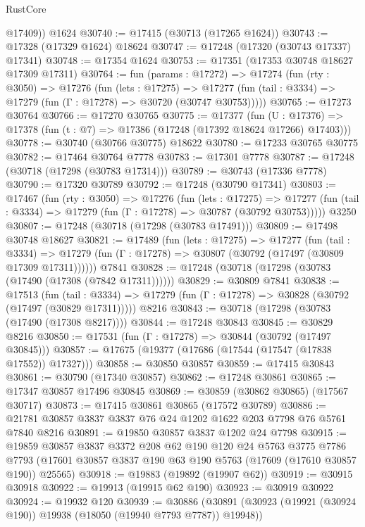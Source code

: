 \begin{lexlean}{RustCore}
\begin{coremodule}
        @17409))
    @1624
@30740 := @17415 (@30713 (@17265 @1624))
@30743 := @17328 (@17329 @1624) @18624
@30747 := @17248 (@17320 (@30743 @17337) @17341)
@30748 := @17354 @1624
@30753 := @17351 (@17353 @30748 @18627 @17309 @17311)
@30764 := fun (params : @17272) =>
  @17274
    (fun (rty : @3050) =>
    @17276
      (fun (lets : @17275) =>
      @17277 (fun (tail : @3334) => @17279 (fun (Γ : @17278) => @30720 (@30747 @30753)))))
@30765 := @17273 @30764
@30766 := @17270 @30765
@30775 := @17377
    (fun (U : @17376) => @17378 (fun (t : @7) => @17386 (@17248 (@17392 @18624 @17266) @17403)))
@30778 := @30740 (@30766 @30775) @18622
@30780 := @17233 @30765 @30775
@30782 := @17464 @30764 @7778
@30783 := @17301 @7778
@30787 := @17248 (@30718 (@17298 (@30783 @17314)))
@30789 := @30743 (@17336 @7778)
@30790 := @17320 @30789
@30792 := @17248 (@30790 @17341)
@30803 := @17467
    (fun (rty : @3050) =>
    @17276
      (fun (lets : @17275) =>
      @17277 (fun (tail : @3334) => @17279 (fun (Γ : @17278) => @30787 (@30792 @30753)))))
    @3250
@30807 := @17248 (@30718 (@17298 (@30783 @17491)))
@30809 := @17498 @30748 @18627
@30821 := @17489
    (fun (lets : @17275) =>
    @17277
      (fun (tail : @3334) =>
      @17279 (fun (Γ : @17278) => @30807 (@30792 (@17497 (@30809 @17309 @17311))))))
    @7841
@30828 := @17248 (@30718 (@17298 (@30783 (@17490 (@17308 (@7842 @17311))))))
@30829 := @30809 @7841
@30838 := @17513
    (fun (tail : @3334) => @17279 (fun (Γ : @17278) => @30828 (@30792 (@17497 (@30829 @17311)))))
    @8216
@30843 := @30718 (@17298 (@30783 (@17490 (@17308 @8217))))
@30844 := @17248 @30843
@30845 := @30829 @8216
@30850 := @17531 (fun (Γ : @17278) => @30844 (@30792 (@17497 @30845)))
@30857 := @17675 (@19377 (@17686 (@17544 (@17547 (@17838 @17552)) @17327)))
@30858 := @30850 @30857
@30859 := @17415 @30843
@30861 := @30790 (@17340 @30857)
@30862 := @17248 @30861
@30865 := @17347 @30857 @17496 @30845
@30869 := @30859 (@30862 @30865) (@17567 @30717)
@30873 := @17415 @30861 @30865 (@17572 @30789)
@30886 := @21781 @30857 @3837 @3837 @76 @24 @1202 @1622 @203 @7798 @76 @5761 @7840 @8216
@30891 := @19850 @30857 @3837 @1202 @24 @7798
@30915 := @19859
    @30857
    @3837
    @3372
    @208
    @62
    @190
    @120
    @24
    @5763
    @3775
    @7786
    @7793
    (@17601 @30857 @3837 @190 @63 @190 @5763 (@17609 (@17610 @30857 @190)) @25565)
@30918 := @19883 (@19892 (@19907 @62))
@30919 := @30915 @30918
@30922 := @19913 (@19915 @62 @190)
@30923 := @30919 @30922
@30924 := @19932 @120
@30939 := @30886
    (@30891 (@30923 (@19921 (@30924 @190)) @19938 (@18050 (@19940 @7793 @7787)) @19948))

\end{coremodule}
\end{lexlean}
